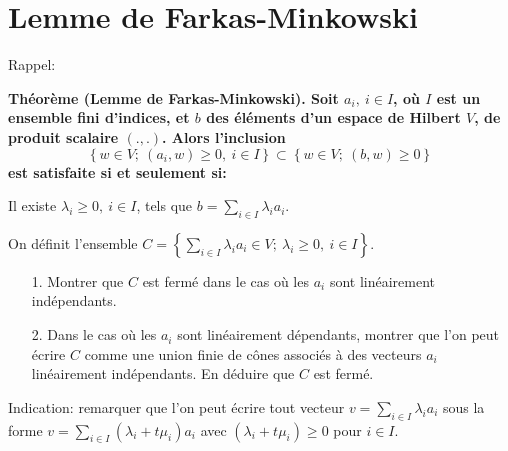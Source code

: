 \documentclass[11pt, a4paper]{article}
\begin{document}
\section*{Lemme de Farkas-Minkowski}


Rappel: {\bf Théorème (Lemme de Farkas-Minkowski). Soit $a_i,~ i \in I$, où $I$ est un ensemble fini d'indices, et $b$ des éléments
d'un espace de Hilbert $V$, de produit scalaire $(.,.)$. Alors l'inclusion
$$ \left \lbrace w \in V;~ (a_i,w) \geq0,~ i \in I \right \rbrace \subset \left \lbrace w \in V;~ (b,w) \geq 0 \right \rbrace$$
est satisfaite si et seulement si:

\quad Il existe $\lambda_i \geq 0,~ i \in I$, tels que $b = \sum_{i \in I} \lambda_i a_i$.
}
\vspace{1em}

On définit l'ensemble $C = \left \lbrace \sum_{i\in I} \lambda_i a_i \in V;~ \lambda_i \geq 0, ~ i \in I \right \rbrace$.

\begin{itemize}
 \item[1.] Montrer que $C$ est fermé dans le cas où les $a_i$ sont linéairement indépendants.
 \item[2.] Dans le cas où les $a_i$ sont linéairement dépendants, montrer que l'on peut écrire $C$
 comme une union finie de cônes associés à des vecteurs $a_i$ linéairement indépendants. En déduire que $C$ est fermé.
\end{itemize}

Indication: remarquer que l'on peut écrire tout vecteur $v = \sum_{i \in I}  \lambda_i a_i$ sous 
la forme $v = \sum_{i \in I} (\lambda_i + t \mu_i) a_i$ avec $(\lambda_i + t \mu_i) \geq 0$ pour $i\in I$.
\end{document}
